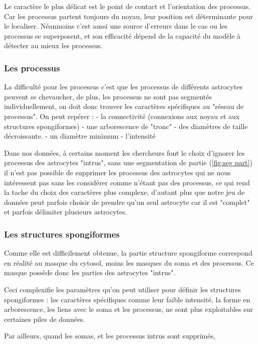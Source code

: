 \documentclass[10pt]{scrartcl}
\begin{document}
Le caractère le plus délicat est le point de contact et l'orientation des processus. Car les processus partent toujours du noyau, leur position est déterminante pour le localiser. Néanmoins c'est aussi une source d'erreurs dans le cas ou les processus se superposent, et son efficacité dépend de la capacité du modèle à détecter au mieux les processus. 

\subsubsection{Les processus}

La difficulté pour les processus c'est que les processus de différents astrocytes peuvent se chevaucher, de plus, les processus ne sont pas segmentés individuellement, on doit donc trouver les caractères spécifiques au "réseau de processus". 
On peut repérer : 
- la connectivité (connexions aux noyau et aux structures spongiformes) 
- une arborescence de "tronc"
- des diamètres de taille décroissante.
- un diamètre minimum
- l'intensité 

Dans nos données, à certains moment les chercheurs font le choix d'ignorer les processus des astrocytes "intrus", sans une segmentation de partie (\ref{fig:seg part}) il n'est pas possible de supprimer les processus des astrocytes qui ne nous intéressent pas sans les considérer comme n'étant pas des processus, ce qui rend la tache du choix des caractères plus complexe, d'autant plus que notre jeu de données peut parfois choisir de prendre qu'un seul astrocyte car il est "complet" et parfois délimiter plusieurs astrocytes.

\subsubsection{Les structures spongiformes}
Comme elle est difficilement obtenue, la partie structure spongiforme correspond en réalité au masque du cytosol, moins les masques du soma et des processus. 
Ce masque possède donc les parties des astrocytes "intrus".

Ceci complexifie les paramètres qu'on peut utiliser pour définir les structures spongiformes :
les caractères spécifiques comme
leur faible intensité,
la forme en arborescence,
les liens avec le soma et les processus,
ne sont plus exploitables sur certaines piles de données. 


Par ailleurs, quand les somas, et les processus intrus sont supprimés, 
\end{document}
